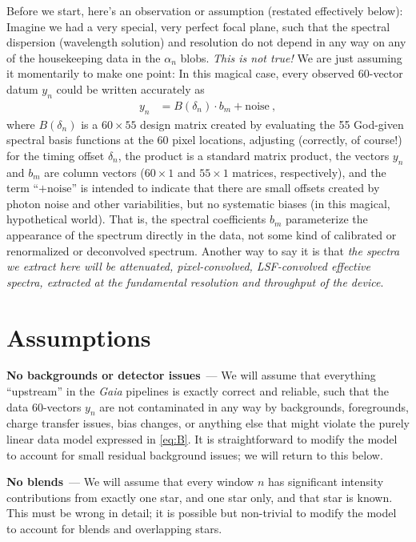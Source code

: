 \documentclass[11pt]{article}
\renewcommand{\paragraph}[1]{\medskip\par\noindent\textbf{#1}~---}
\begin{document}
Before we start, here's an observation or assumption (restated effectively below):
Imagine we had a very special, very perfect focal plane, such that the spectral dispersion (wavelength solution) and resolution do not depend in any way on any of the housekeeping data in the $\alpha_n$ blobs.
\emph{This is not true!} We are just assuming it momentarily to make one point:
In this magical case, every observed 60-vector datum $y_n$ could be written accurately as
\begin{align}
    y_n &= B(\delta_n)\cdot b_m + \mbox{noise} ~,\label{eq:B}
\end{align}
where $B(\delta_n)$ is a $60\times 55$ design matrix created by evaluating the 55 God-given spectral basis functions at the 60 pixel locations, adjusting (correctly, of course!) for the timing offset $\delta_n$,
the product is a standard matrix product,
the vectors $y_n$ and $b_m$ are column vectors ($60\times 1$ and $55\times 1$ matrices, respectively),
and the term ``$+\mbox{noise}$'' is intended to indicate that there are small offsets created by photon noise and other variabilities, but no systematic biases (in this magical, hypothetical world).
That is, the spectral coefficients $b_m$ parameterize the appearance of the spectrum directly in the data, not some kind of calibrated or renormalized or deconvolved spectrum.
Another way to say it is that \emph{the spectra we extract here will be attenuated, pixel-convolved, LSF-convolved effective spectra, extracted at the fundamental resolution and throughput of the device}.

\section{Assumptions}

\paragraph{No backgrounds or detector issues}
We will assume that everything ``upstream'' in the \textsl{Gaia} pipelines is exactly correct and reliable, such that the data 60-vectors $y_n$ are not contaminated in any way by backgrounds, foregrounds, charge transfer issues, bias changes, or anything else that might violate the purely linear data model expressed in \eqref{eq:B}.
It is straightforward to modify the model to account for small residual background issues; we will return to this below.

\paragraph{No blends}
We will assume that every window $n$ has significant intensity contributions from exactly one star, and one star only, and that star is known.
This must be wrong in detail; it is possible but non-trivial to modify the model to account for blends and overlapping stars.
\end{document}
